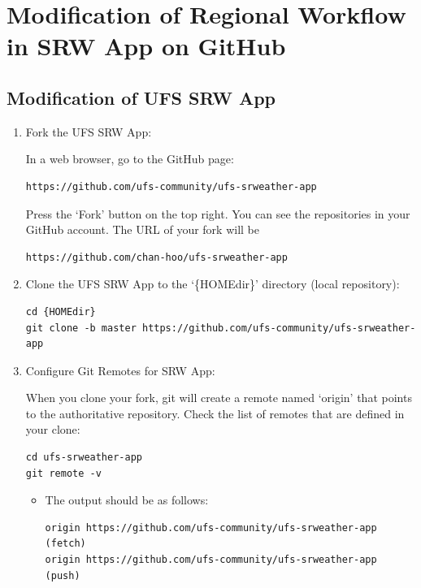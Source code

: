 \documentclass[11pt,fleqn]{report}              %
\begin{document}
\section{Modification of Regional Workflow in SRW App on GitHub}
\label{sec:modify_srw_wflow_github}

\subsection{Modification of UFS SRW App}
\label{subsec:modify_srw_github}

\begin{enumerate}

\item Fork the UFS SRW App:

In a web browser, go to the GitHub page:
\lstset{language=bash}   
\begin{lstlisting}[frame=trBL]
https://github.com/ufs-community/ufs-srweather-app
\end{lstlisting}

Press the `Fork' button on the top right. You can see the repositories in your GitHub account. The URL of your fork will be
\lstset{language=bash}   
\begin{lstlisting}[frame=trBL]
https://github.com/chan-hoo/ufs-srweather-app
\end{lstlisting}

\item Clone the UFS SRW App to the `\{HOMEdir\}' directory (local repository):

\lstset{language=bash}   
\begin{lstlisting}[frame=trBL]
cd {HOMEdir}
git clone -b master https://github.com/ufs-community/ufs-srweather-app
\end{lstlisting}


\item Configure Git Remotes for SRW App:

When you clone your fork, git will create a remote named `origin' that points to the authoritative repository. Check the list of remotes that are defined in your clone:
\lstset{language=bash}   
\begin{lstlisting}[frame=trBL]
cd ufs-srweather-app
git remote -v
\end{lstlisting}

\begin{itemize}
\item The output should be as follows:
\lstset{language=bash}   
\begin{lstlisting}[frame=trBL]
origin https://github.com/ufs-community/ufs-srweather-app (fetch)
origin https://github.com/ufs-community/ufs-srweather-app (push)
\end{lstlisting}
\end{itemize}


\end{enumerate}
\end{document}
